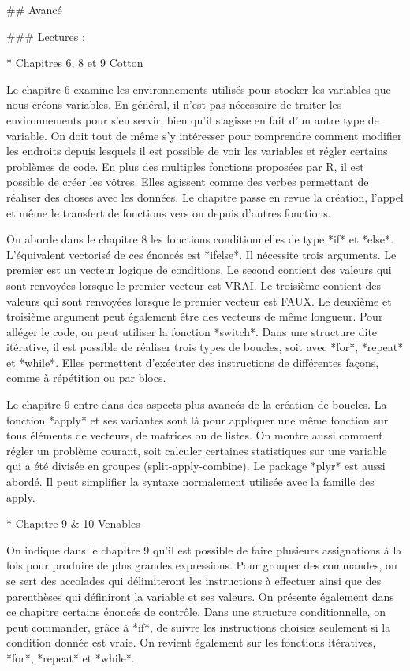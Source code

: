 \documentclass[
  letterpaper,
]{scrbook}
\begin{document}
\#\# Avancé

\#\#\# Lectures :

* Chapitres 6, 8 et 9 Cotton

Le chapitre 6 examine les environnements utilisés pour stocker les
variables que nous créons variables. En général, il n'est pas nécessaire
de traiter les environnements pour s'en servir, bien qu'il s'agisse en
fait d'un autre type de variable. On doit tout de même s'y intéresser
pour comprendre comment modifier les endroits depuis lesquels il est
possible de voir les variables et régler certains problèmes de code. En
plus des multiples fonctions proposées par R, il est possible de créer
les vôtres. Elles agissent comme des verbes permettant de réaliser des
choses avec les données. Le chapitre passe en revue la création, l'appel
et même le transfert de fonctions vers ou depuis d'autres fonctions.

On aborde dans le chapitre 8 les fonctions conditionnelles de type *if*
et *else*. L'équivalent vectorisé de ces énoncés est *ifelse*. Il
nécessite trois arguments. Le premier est un vecteur logique de
conditions. Le second contient des valeurs qui sont renvoyées lorsque le
premier vecteur est VRAI. Le troisième contient des valeurs qui sont
renvoyées lorsque le premier vecteur est FAUX. Le deuxième et troisième
argument peut également être des vecteurs de même longueur. Pour alléger
le code, on peut utiliser la fonction *switch*. Dans une structure dite
itérative, il est possible de réaliser trois types de boucles, soit avec
*for*, *repeat* et *while*. Elles permettent d'exécuter des instructions
de différentes façons, comme à répétition ou par blocs.

Le chapitre 9 entre dans des aspects plus avancés de la création de
boucles. La fonction *apply* et ses variantes sont là pour appliquer une
même fonction sur tous éléments de vecteurs, de matrices ou de listes.
On montre aussi comment régler un problème courant, soit calculer
certaines statistiques sur une variable qui a été divisée en groupes
(split-apply-combine). Le package *plyr* est aussi abordé. Il peut
simplifier la syntaxe normalement utilisée avec la famille des apply.

* Chapitre 9 \& 10 Venables

On indique dans le chapitre 9 qu'il est possible de faire plusieurs
assignations à la fois pour produire de plus grandes expressions. Pour
grouper des commandes, on se sert des accolades qui délimiteront les
instructions à effectuer ainsi que des parenthèses qui définiront la
variable et ses valeurs. On présente également dans ce chapitre certains
énoncés de contrôle. Dans une structure conditionnelle, on peut
commander, grâce à *if*, de suivre les instructions choisies seulement
si la condition donnée est vraie. On revient également sur les fonctions
itératives, *for*, *repeat* et *while*.
\end{document}
